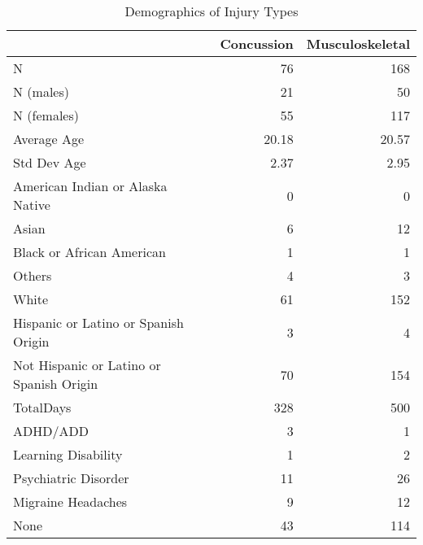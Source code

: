 \documentclass[12]{article}
\begin{document}
\begin{table}[htbp]
\centering
\begin{tabular}{lrr}
  \hline
 & Concussion & Musculoskeletal \\ 
  \hline
N & 76 & 168 \\ 
  N (males) & 21 & 50 \\ 
  N (females) & 55 & 117 \\ 
  Average Age & 20.18 & 20.57 \\ 
  Std Dev Age & 2.37 & 2.95 \\ 
  American Indian or Alaska Native & 0 & 0 \\ 
  Asian & 6 & 12 \\ 
  Black or African American & 1 & 1 \\ 
  Others & 4 & 3 \\ 
  White & 61 & 152 \\ 
  Hispanic or Latino or Spanish Origin & 3 & 4 \\ 
  Not Hispanic or Latino or Spanish Origin & 70 & 154 \\ 
  TotalDays & 328 & 500 \\ 
  ADHD/ADD & 3 & 1 \\ 
  Learning Disability & 1 & 2 \\ 
  Psychiatric Disorder & 11 & 26 \\ 
  Migraine Headaches & 9 & 12 \\ 
  None & 43 & 114 \\ 
   \hline
\end{tabular}
\caption{Demographics of Injury Types} 
\label{tab:Tab0Table1}
\end{table}
\end{document}
